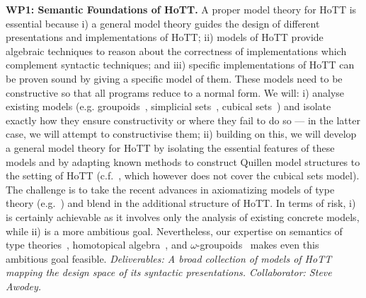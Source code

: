 \documentclass[a4paper,11pt]{article}
\begin{document}



{\bf WP1: Semantic Foundations of HoTT.}  %
A proper model theory for
HoTT is essential because i) a general model theory 
guides the design of different presentations and implementations of
HoTT; ii) models of HoTT provide algebraic techniques to reason
about the correctness of implementations which complement syntactic
techniques; and iii) specific implementations of HoTT can
be proven sound by giving a specific model of them.  These models
need to be constructive so that all programs reduce to a normal form.
We will: i) analyse existing models ({e.g.}
groupoids~\cite{HofmannM:groitt}, simplicial
sets~\cite{KapulkinC:simmuv}, cubical sets~\cite{BezemM:cubsmt}) and
isolate exactly how they ensure constructivity or where they fail to
do so --- in the latter case, we will attempt to constructivise them;
ii) building on this, we will develop a general model theory for HoTT
by isolating the essential features of these models and by adapting
known methods to construct Quillen model structures to the setting of
HoTT ({c.f.}~\cite{ShulmanM:uniidh}, which however does not cover the
cubical sets model).  The challenge is to take the recent advances in
axiomatizing models of type theory
({e.g.}~\cite{AwodeyS:natmtt}) and blend in the additional structure of HoTT. In terms
of risk, i) is certainly achievable as it involves only the
analysis of existing concrete models, while ii) is a more ambitious
goal. Nevertheless, our expertise on semantics of type
theories~\cite{neil2014relParamDep}, homotopical
algebra~\cite{GambinoN:homl2c,GambinoN:weilsh}, and
$\omega$-groupoids~\cite{alti:csl12} makes even this ambitious goal
feasible. {\em Deliverables: A broad collection of models of HoTT
mapping the design space of its syntactic presentations.
Collaborator: Steve Awodey.
}
\end{document}
